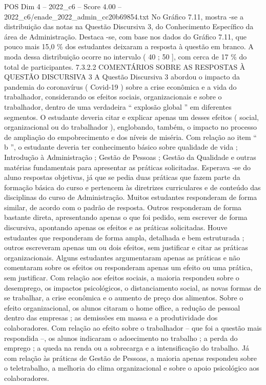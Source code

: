 \begin{textsample}{POS Dim 4 – 2022\_c6 – Score 4.00 – 2022\_c6/enade\_2022\_admin\_cc20b69854.txt}
No Gráfico 7.11, mostra -se a distribuição das notas na Questão Discursiva 3, do Conhecimento Específico da área de Administração.
Destaca -se, com base nos dados do Gráfico 7.11, que pouco mais 15,0 \% dos estudantes deixaram a resposta à questão em branco.
A moda dessa distribuição ocorre no intervalo ( 40 ; 50 ], com cerca de 17 \% do total de participantes. 7.3.2.2 COMENTÁRIOS SOBRE AS RESPOSTAS À QUESTÃO DISCURSIVA 3 A Questão Discursiva 3 abordou o impacto da pandemia do coronavírus ( Covid-19 ) sobre a crise econômica e a vida do trabalhador, considerando os efeitos sociais, organizacionais e sobre o trabalhador, dentro de uma verdadeira “ explosão global ” em diferentes segmentos.
O estudante deveria citar e explicar apenas um desses efeitos ( social, organizacional ou do trabalhador ), englobando, também, o impacto no processo de ampliação do empobrecimento e dos níveis de miséria.
Com relação ao item “ b ”, o estudante deveria ter conhecimento básico sobre qualidade de vida ; Introdução à Administração ; Gestão de Pessoas ; Gestão da Qualidade e outras matérias fundamentais para apresentar as práticas solicitadas.
Esperava -se do aluno respostas objetivas, já que se pedia duas práticas que fazem parte da formação básica do curso e pertencem às diretrizes curriculares e de conteúdo das disciplinas do curso de Administração.
Muitos estudantes responderam de forma similar, de acordo com o padrão de resposta.
Outros responderam de forma bastante direta, apresentando apenas o que foi pedido, sem escrever de forma discursiva, apontando apenas os efeitos e as práticas solicitadas.
Houve estudantes que responderam de forma ampla, detalhada e bem estruturada ; outros escreveram apenas um ou dois efeitos, sem justificar e citar as práticas organizacionais.
Alguns estudantes argumentaram apenas as práticas e não comentaram sobre os efeitos ou responderam apenas um efeito ou uma prática, sem justificar.
Com relação aos efeitos sociais, a maioria respondeu sobre o desemprego, os impactos psicológicos, o distanciamento social, as novas formas de se trabalhar, a crise econômica e o aumento de preço dos alimentos.
Sobre o efeito organizacional, os alunos citaram o home office, a redução de pessoal dentro das empresas ; as demissões em massa e a produtividade dos colaboradores.
Com relação ao efeito sobre o trabalhador – que foi a questão mais respondida –, os alunos indicaram o adoecimento no trabalho ; a perda do emprego ; a queda na renda ou a sobrecarga e a intensificação do trabalho.
Já com relação às práticas de Gestão de Pessoas, a maioria apenas respondeu sobre o teletrabalho, a melhoria do clima organizacional e sobre o apoio psicológico aos colaboradores.

\end{textsample}
